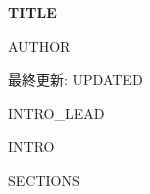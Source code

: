 \documentclass[10pt,a4paper,landscape]{ltjsarticle}
\begin{document}
\begin{center}
  {\Large\bfseries {{TITLE}}\par}
  \vspace{1.5mm}
  {{AUTHOR}}\par
  \vspace{0.7mm}
  {\small\color{black!55}最終更新: {{UPDATED}}\par}
\end{center}
\vspace{1mm}

{{INTRO_LEAD}}

\vspace{1mm}
\begin{itemize}[leftmargin=5mm,itemsep=1mm,topsep=1mm]
{{INTRO}}
\end{itemize}

{{SECTIONS}}

\vfill
{\footnotesize{}}
\end{document}
